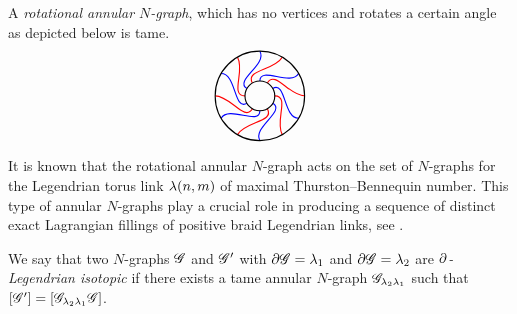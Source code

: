 \begin{example}
A \emph{rotational annular $N$-graph}, which has no vertices and rotates a certain angle as depicted below is tame.
\[
\begin{tikzpicture}[baseline=-.5ex, scale=0.75]
\draw [thick, red] (0.5*1/2,{1/2*sqrt(3)/2}) to[out=60,in=180] (1.5,0);
\draw [rotate around={60:(0,0)},thick, red] (0.5*1/2,{1/2*sqrt(3)/2}) to[out=60,in=180] (1.5,0);
\draw [rotate around={120:(0,0)},thick, red] (0.5*1/2,{1/2*sqrt(3)/2}) to[out=60,in=180] (1.5,0);
\draw [rotate around={180:(0,0)},thick, red] (0.5*1/2,{1/2*sqrt(3)/2}) to[out=60,in=180] (1.5,0);
\draw [rotate around={240:(0,0)},thick, red] (0.5*1/2,{1/2*sqrt(3)/2}) to[out=60,in=180] (1.5,0);
\draw [rotate around={300:(0,0)},thick, red] (0.5*1/2,{1/2*sqrt(3)/2}) to[out=60,in=180] (1.5,0);

\draw [thick, blue] ({1.5*sqrt(3)/2},{1.5*1/2}) to[out=-120, in=90] (0,0.5);
\draw [rotate around={60:(0,0)}, thick, blue] ({1.5*sqrt(3)/2},{1.5*1/2}) to[out=-120, in=90] (0,0.5);
\draw [rotate around={120:(0,0)}, thick, blue] ({1.5*sqrt(3)/2},{1.5*1/2}) to[out=-120, in=90] (0,0.5);
\draw [rotate around={180:(0,0)}, thick, blue] ({1.5*sqrt(3)/2},{1.5*1/2}) to[out=-120, in=90] (0,0.5);
\draw [rotate around={240:(0,0)}, thick, blue] ({1.5*sqrt(3)/2},{1.5*1/2}) to[out=-120, in=90] (0,0.5);
\draw [rotate around={300:(0,0)}, thick, blue] ({1.5*sqrt(3)/2},{1.5*1/2}) to[out=-120, in=90] (0,0.5);

\draw [thick] (0,0) circle [radius=1.5];
\draw [thick] (0,0) circle [radius=0.5];
\end{tikzpicture}
\]

It is known that the rotational annular $N$-graph acts on the set of $N$-graphs for the Legendrian torus link $\lambda(n,m)$ of maximal Thurston--Bennequin number.
This type of annular $N$-graphs play a crucial role in producing a sequence of distinct exact Lagrangian fillings of positive braid Legendrian links, see \cite{Kal2006, CG2020, GSW2020b}.
\end{example}


\begin{definition}\label{def:boundary Legendrian isotopic}
We say that two $N$-graphs $\mathscr{G}$ and $\mathscr{G}'$ with $\partial\mathscr{G}=\lambda_1$ and $\partial\mathscr{G}=\lambda_2$ are \emph{$\partial$-Legendrian isotopic} if there exists a tame annular $N$-graph $\mathscr{G}_{\lambda_2\lambda_1}$ such that $[\mathscr{G}']= [\mathscr{G}_{\lambda_2\lambda_1}\mathscr{G}]$.
\end{definition}





